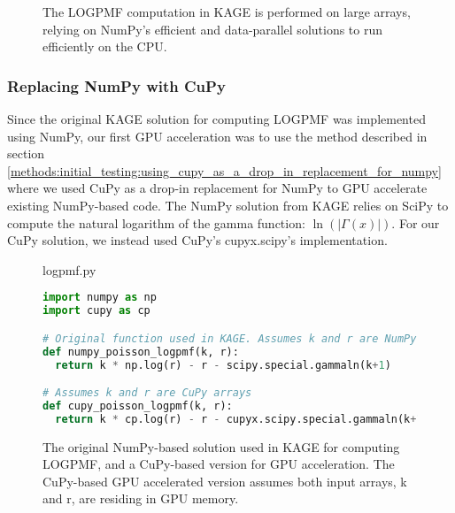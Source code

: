 \begin{figure}[H]
\begin{center}
{
}
\caption{
  The LOGPMF computation in KAGE is performed on large arrays, relying on NumPy's efficient and data-parallel solutions to run efficiently on the CPU.
}
\label{methods:gpu_accelerating_genotyping:figures:logpmf}
\end{center}
\end{figure}

\subsubsection{Replacing NumPy with CuPy}
Since the original KAGE solution for computing LOGPMF was implemented using NumPy, our first GPU acceleration was to use the method described in section \ref{methods:initial_testing:using_cupy_as_a_drop_in_replacement_for_numpy} where we used CuPy as a drop-in replacement for NumPy to GPU accelerate existing NumPy-based code.
The NumPy solution from KAGE relies on SciPy \cite{scipy} to compute the natural logarithm of the gamma function: $\ln(|\Gamma(x)|)$.
For our CuPy solution, we instead used CuPy's cupyx.scipy's implementation.

\begin{figure}[H] 
\begin{center}
logpmf.py
\end{center}
\begin{lstlisting}[language=Python,style=pycode]
import numpy as np
import cupy as cp

# Original function used in KAGE. Assumes k and r are NumPy arrays
def numpy_poisson_logpmf(k, r):
  return k * np.log(r) - r - scipy.special.gammaln(k+1) 

# Assumes k and r are CuPy arrays
def cupy_poisson_logpmf(k, r):
  return k * cp.log(r) - r - cupyx.scipy.special.gammaln(k+1) 
\end{lstlisting}
\caption{
  The original NumPy-based solution used in KAGE for computing LOGPMF, and a CuPy-based version for GPU acceleration.
  The CuPy-based GPU accelerated version assumes both input arrays, k and r, are residing in GPU memory.
}
\label{methods:gpu_accelerating_genotyping:figures:logpmf_array_implementations}
\end{figure}

